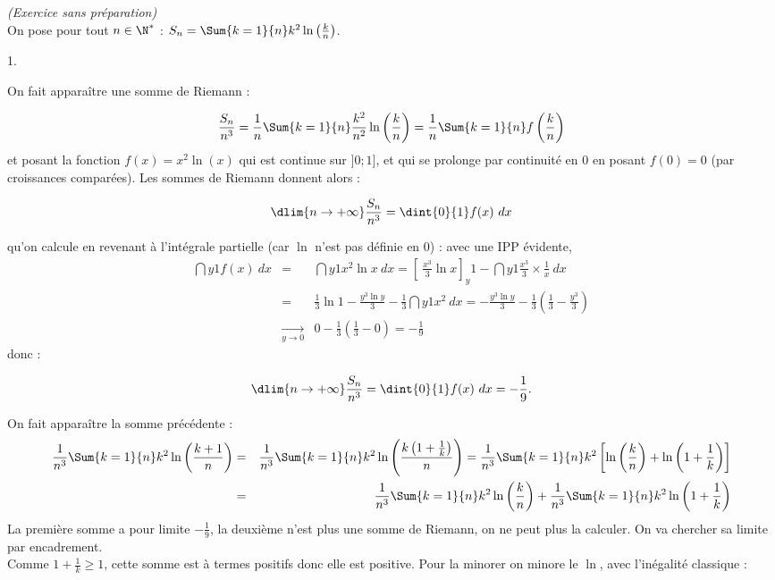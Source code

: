 \documentclass[11pt]{article}%
\begin{document}
\begin{exercice}{\it (Exercice sans préparation)}~\\
 On pose pour tout $n \in \N^*$ : $S_{n} = \Sum{k = 1}{n} k^{2} \ln
\left(
 \frac{ k }{ n } \right)$.
 \begin{noliste}{1.}
 \setlength{\itemsep}{4mm}
 \item On fait apparaître une somme de Riemann :
 
\[
 \frac{ S_{n} }{ n^{3} } = \frac{ 1 }{ n } \Sum{k = 1}{n} \frac{ k^{2}
}{
 n^{2} } \ln \left( \frac{ k }{ n } \right) = \frac{ 1 }{ n }
 \Sum{k = 1}{n} f \left( \frac{ k }{ n } \right)
\]
 et posant la fonction $f(x) = x^{2} \ln (x)$ qui est continue sur
 $]0;1]$, et qui se prolonge par continuité en 0 en posant $f(0) = 
 0$ (par croissances comparées). Les sommes de Riemann donnent
 alors :
 
\[
 \dlim{ n \rightarrow + \infty } \frac{ S_{n} }{ n^{3} } = \dint{0}{1}
f(x) \ dx 
\]
 
 qu'on calcule en revenant à l'intégrale partielle (car $\ln$ n'est
 pas définie en 0) : avec une IPP évidente,
 \begin{eqnarray*}
 \dint{y}{1} f(x) \ dx & = & \dint{y}{1} x^{2} \ln x \ dx = \left[ \
\frac{
 x^{3} }{ 3 } \ln x \right]_{y}{1} - \dint{y}{1} \frac{ x^{3} }{ 3 }
 \times \frac{ 1 }{ x } \ dx \\
 & = & \frac{ 1 }{ 3 } \ln 1 - \frac{ y^{3} \ln y }{ 3 } - \frac{ 1
 }{ 3 } \dint{y}{1} x^{2} \ dx = - \frac{ y^{3} \ln y }{ 3 } - \frac{ 1
 }{ 3 } \left( \frac{ 1 }{ 3 } - \frac{ y^{3} }{ 3 } \right) \\
 & \xrightarrow[ y \rightarrow 0 ]{} & 0 - \frac{ 1 }{ 3 } \left(
 \frac{ 1 }{ 3 } - 0 \right) = - \frac{ 1 }{ 9 } 
 \end{eqnarray*} 
 donc :
 
\[
 \dlim{ n \rightarrow + \infty } \frac{ S_{n} }{ n^{3} } = \dint{0}{1}
 f(x) \ dx = - \frac{ 1 }{ 9 }.
\]
 
 \item On fait apparaître la somme précédente :
 \begin{eqnarray*}
 \frac{1}{n^{3}} \Sum{k = 1}{n} k^{2} \ln \left( \frac{ k + 1 }{ n }
 \right) & = & \frac{1}{n^{3}} \Sum{k = 1}{n} k^{2} \ln \left( \frac{ k
 \left( 1 + \frac{ 1 }{ k } \right) }{ n } \right) = 
 \frac{1}{n^{3}} \Sum{k = 1}{n} k^{2} \left[ \ln \left( \frac{ k }{ n
 } \right) + \ln \left( 1 + \frac{ 1 }{ k } \right) \right] \\
 & = & \frac{1}{n^{3}} \Sum{k = 1}{n} k^{2} \ln \left( \frac{ k }{ n }
 \right) + \frac{1}{n^{3}} \Sum{k = 1}{n} k^{2} \ln \left( 1 + \frac{
 1 }{ k } \right) 
 \end{eqnarray*} 
 La première somme a pour limite $- \frac{1}{9}$, la deuxième n'est
 plus une somme de Riemann, on ne peut plus la calculer. On va
 chercher sa limite par encadrement. \\
 Comme $ 1 + \frac{ 1 }{ k } \geq 1$, cette somme est à termes
 positifs donc elle est positive. Pour la minorer on minore le
 $\ln$, avec l'inégalité classique :
 

\end{noliste}
\end{exercice}
\end{document}

